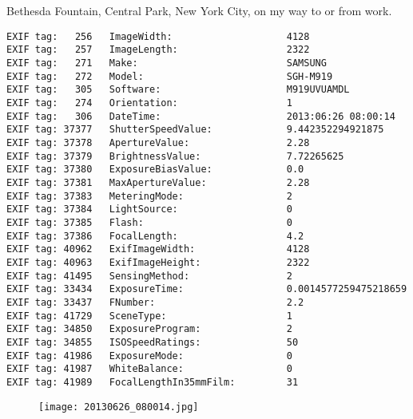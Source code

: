 \section{\protect{}}
\noindent Bethesda Fountain, Central Park, New York City, on my way to or from work.
\noindent
\begin{lstlisting}
EXIF tag:   256   ImageWidth:                    4128
EXIF tag:   257   ImageLength:                   2322
EXIF tag:   271   Make:                          SAMSUNG
EXIF tag:   272   Model:                         SGH-M919
EXIF tag:   305   Software:                      M919UVUAMDL
EXIF tag:   274   Orientation:                   1
EXIF tag:   306   DateTime:                      2013:06:26 08:00:14
EXIF tag: 37377   ShutterSpeedValue:             9.442352294921875
EXIF tag: 37378   ApertureValue:                 2.28
EXIF tag: 37379   BrightnessValue:               7.72265625
EXIF tag: 37380   ExposureBiasValue:             0.0
EXIF tag: 37381   MaxApertureValue:              2.28
EXIF tag: 37383   MeteringMode:                  2
EXIF tag: 37384   LightSource:                   0
EXIF tag: 37385   Flash:                         0
EXIF tag: 37386   FocalLength:                   4.2
EXIF tag: 40962   ExifImageWidth:                4128
EXIF tag: 40963   ExifImageHeight:               2322
EXIF tag: 41495   SensingMethod:                 2
EXIF tag: 33434   ExposureTime:                  0.0014577259475218659
EXIF tag: 33437   FNumber:                       2.2
EXIF tag: 41729   SceneType:                     1
EXIF tag: 34850   ExposureProgram:               2
EXIF tag: 34855   ISOSpeedRatings:               50
EXIF tag: 41986   ExposureMode:                  0
EXIF tag: 41987   WhiteBalance:                  0
EXIF tag: 41989   FocalLengthIn35mmFilm:         31

\end{lstlisting}
\clearpage
\begin{figure}
\raggedleft
\texttt{[image: 20130626\_080014.jpg]}
\end{figure}


\clearpage
